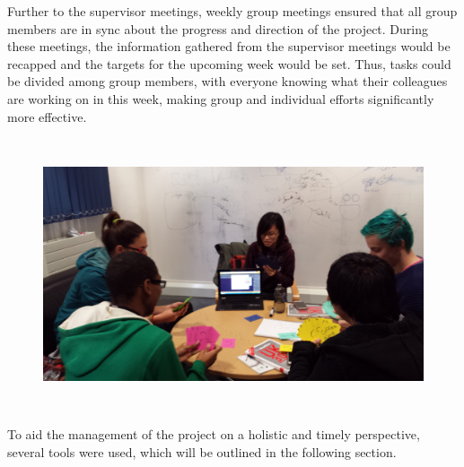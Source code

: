 \documentclass[11pt, a4paper]{article}
\begin{document}
Further to the supervisor meetings, weekly group meetings ensured that all group members are in sync about the progress and direction of the project. 
During these meetings, the information gathered from the supervisor meetings would be recapped and the targets for the upcoming week would be set. 
Thus, tasks could be divided among group members, with everyone knowing what their colleagues are working on in this week, making group and individual efforts significantly more effective.
\begin{figure}[h!]
\centering
\includegraphics[height=80mm,width=130mm]{estimation.jpg}
\end{figure}

To aid the management of the project on a holistic and timely perspective, several tools were used, which will be outlined in the following section.
\end{document}
